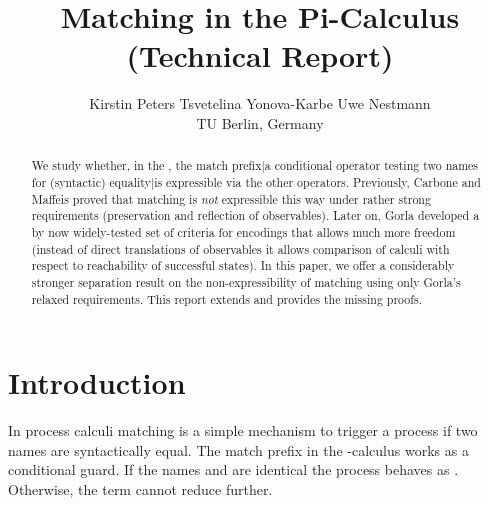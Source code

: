 \documentclass[]{article}
\title{Matching in the Pi-Calculus (Technical Report)}
\author{Kirstin Peters \qquad\qquad Tsvetelina Yonova-Karbe \qquad\qquad Uwe Nestmann\vspace{0.5em}\\
TU Berlin, Germany}
\begin{document}
\maketitle



\begin{abstract}
	We study whether, in the \piCal, the {match prefix}|{a} conditional operator testing two names for (syntactic) {equality}|{is} expressible via the other operators.
	Previously, Carbone and Maffeis proved that matching is \emph{not} expressible this way under rather strong requirements (preservation and reflection of observables).
	Later on, Gorla developed a by now widely-tested set of criteria for encodings that allows much more freedom (\eg instead of direct translations of observables it allows comparison of calculi with respect to reachability of successful states).
    In this paper, we offer a considerably stronger separation result on the non-expressibility of matching using only Gorla's relaxed requirements.
    This report extends \cite{pyn14} and provides the missing proofs.
\end{abstract}



\section{Introduction}

In process calculi matching is a simple mechanism to trigger a process if two names are syntactically equal. The match prefix  in the -calculus works as a conditional guard. If the names  and  are identical the process behaves as . Otherwise, the term cannot reduce further.
\end{document}
